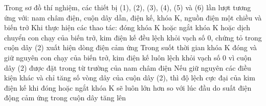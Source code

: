 \begin{ex}
\begin{minipage}[t]{0.42\linewidth}
		\end{minipage}
		\choiceTFt
		{\True Trong sơ đồ thí nghiệm, các thiết bị (1), (2), (3), (4), (5) và (6) lần lượt tương ứng với: nam châm điện, cuộn dây dẫn, điện kế, khóa K, nguồn điện một chiều và biến trở}
		{\True Khi thực hiện các thao tác: đóng khóa K hoặc ngắt khóa K hoặc dịch chuyển con chạy của biến trở, kim điện kế đều lệch khỏi vạch số 0, chứng tỏ trong cuộn dây (2) xuất hiện dòng điện cảm ứng}
		{Trong suốt thời gian khóa K đóng và giữ nguyên con chạy của biến trở, kim điện kế luôn lệch khỏi vạch số 0 vì cuộn dây (2) được đặt trong từ trường của nam châm điện}
		{\True Nếu giữ nguyên các điều kiện khác và chỉ tăng số vòng dây của cuộn dây (2), thì độ lệch cực đại của kim điện kế khi đóng hoặc ngắt khóa K sẽ luôn lớn hơn so với lúc đầu do suất điện động cảm ứng trong cuộn dây tăng lên}
	\end{ex}

